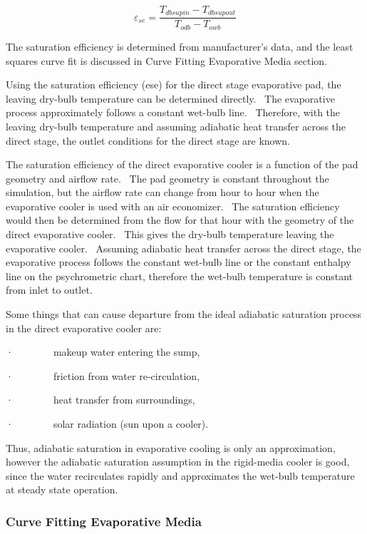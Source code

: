 \begin{equation}
{\varepsilon_{se}} = \frac{{{T_{dbsupin}} - {T_{dbsupout}}}}{{{T_{odb}} - {T_{owb}}}}
\end{equation}

The saturation efficiency is determined from manufacturer's data, and the least squares curve fit is discussed in Curve Fitting Evaporative Media section.

Using the saturation efficiency (ese) for the direct stage evaporative pad, the leaving dry-bulb temperature can be determined directly.~ The evaporative process approximately follows a constant wet-bulb line.~ Therefore, with the leaving dry-bulb temperature and assuming adiabatic heat transfer across the direct stage, the outlet conditions for the direct stage are known.

The saturation efficiency of the direct evaporative cooler is a function of the pad geometry and airflow rate.~ The pad geometry is constant throughout the simulation, but the airflow rate can change from hour to hour when the evaporative cooler is used with an air economizer.~ The saturation efficiency would then be determined from the flow for that hour with the geometry of the direct evaporative cooler.~ This gives the dry-bulb temperature leaving the evaporative cooler.~ Assuming adiabatic heat transfer across the direct stage, the evaporative process follows the constant wet-bulb line or the constant enthalpy line on the psychrometric chart, therefore the wet-bulb temperature is constant from inlet to outlet.

Some things that can cause departure from the ideal adiabatic saturation process in the direct evaporative cooler are:

·~~~~~~~~makeup water entering the sump,

·~~~~~~~~friction from water re-circulation,

·~~~~~~~~heat transfer from surroundings,

·~~~~~~~~solar radiation (sun upon a cooler).

Thus, adiabatic saturation in evaporative cooling is only an approximation, however the adiabatic saturation assumption in the rigid-media cooler is good, since the water recirculates rapidly and approximates the wet-bulb temperature at steady state operation.

\subsubsection{Curve Fitting Evaporative Media}\label{curve-fitting-evaporative-media}

